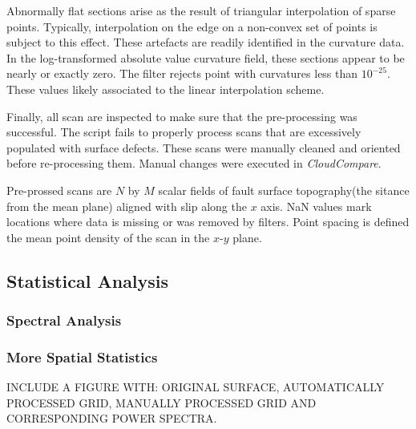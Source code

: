 \documentclass[12pt,a4paper]{article}
\begin{document}
Abnormally flat sections arise as the result of triangular interpolation of sparse points. Typically, interpolation on the edge on a non-convex set of points is subject to this effect. These artefacts are readily identified in the curvature data. In the log-transformed absolute value curvature field, these sections appear to be nearly or exactly zero. The filter rejects point with curvatures less than $10^{-25}$. These values likely associated to the linear interpolation scheme.

Finally, all scan are inspected to make sure that the pre-processing was successful. The script fails to properly process scans that are excessively populated with surface defects. These scans were manually cleaned and oriented before re-processing them. Manual changes were executed in \textit{CloudCompare}. 

Pre-prossed scans are $N$ by $M$ scalar fields of fault surface topography(the sitance from the mean plane) aligned with slip along the $x$ axis. NaN values mark locations where data is missing or was removed by filters. Point spacing is defined the mean point density of the scan in the $x$-$y$ plane.
	\subsection{Statistical Analysis}
		

		\subsubsection{Spectral Analysis}
		

		\subsubsection{More Spatial Statistics}
	

INCLUDE A FIGURE WITH: ORIGINAL SURFACE, AUTOMATICALLY PROCESSED GRID, MANUALLY PROCESSED GRID AND CORRESPONDING POWER SPECTRA.
\end{document}
